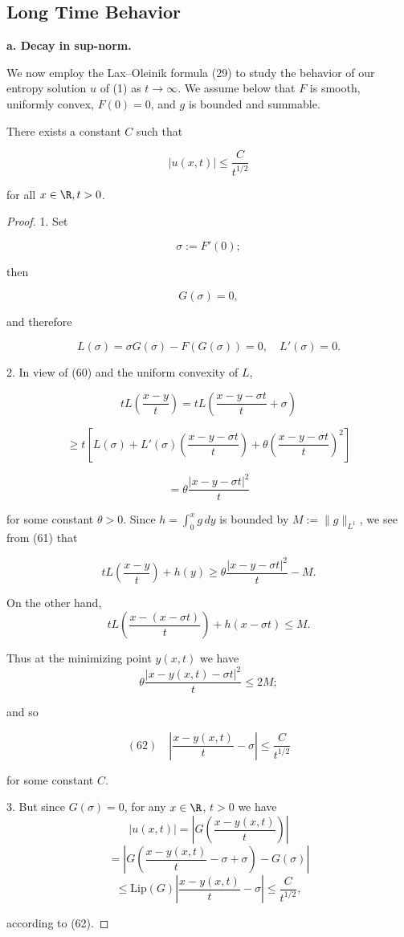 \subsection{Long Time Behavior}
\label{sec:conservation-laws-long-time-behavior}

\textbf{a. Decay in sup-norm.}

We now employ the Lax--Oleinik formula (29) to study the behavior of our entropy solution $u$ of (1) as $t \to \infty$. We assume below that $F$ is smooth, uniformly convex, $F(0) = 0$, and $g$ is bounded and summable.

\begin{theorem}
\label{thm:asymptotics-sup-norm}
There exists a constant $C$ such that

$$|u(x,t)| \leq \frac{C}{t^{1/2}}$$

for all $x \in \R, t > 0$.
\end{theorem}

\begin{proof}
1. Set

$$\sigma := F'(0);$$

then

$$G(\sigma) = 0,$$

and therefore

$$L(\sigma) = \sigma G(\sigma) - F(G(\sigma)) = 0, \quad L'(\sigma) = 0.$$

2. In view of (60) and the uniform convexity of $L$,

$$tL\left(\frac{x-y}{t}\right) = tL\left(\frac{x-y-\sigma t}{t} + \sigma\right)$$

$$\geq t\left[L(\sigma) + L'(\sigma)\left(\frac{x-y-\sigma t}{t}\right) + \theta\left(\frac{x-y-\sigma t}{t}\right)^2\right]$$

$$= \theta\frac{|x-y-\sigma t|^2}{t}$$

for some constant $\theta > 0$. Since $h = \int_0^x g \, dy$ is bounded by $M := \|g\|_{L^1}$, we see from (61) that

$$tL\left(\frac{x-y}{t}\right) + h(y) \geq \theta\frac{|x-y-\sigma t|^2}{t} - M.$$

On the other hand,
$$tL\left(\frac{x-(x-\sigma t)}{t}\right) + h(x-\sigma t) \leq M.$$

Thus at the minimizing point $y(x,t)$ we have
$$\theta\frac{|x-y(x,t)-\sigma t|^2}{t} \leq 2M;$$

and so

$$(62) \quad \left|\frac{x-y(x,t)}{t} - \sigma\right| \leq \frac{C}{t^{1/2}}$$

for some constant $C$.

3. But since $G(\sigma)=0$, for any $x \in \R$, $t > 0$ we have
$$|u(x,t)| = \left|G\left(\frac{x-y(x,t)}{t}\right)\right|$$
$$= \left|G\left(\frac{x-y(x,t)}{t} - \sigma + \sigma\right) - G(\sigma)\right|$$
$$\leq \text{Lip}(G)\left|\frac{x-y(x,t)}{t} - \sigma\right| \leq \frac{C}{t^{1/2}},$$

according to (62).
\end{proof}

